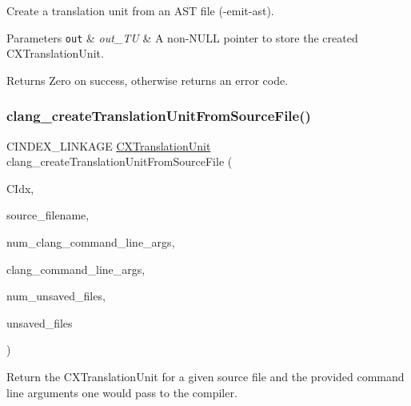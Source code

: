 Create a translation unit from an A\+ST file ({\ttfamily -\/emit-\/ast}). 


\begin{DoxyParams}[1]{Parameters}
\mbox{\tt out}  & {\em out\+\_\+\+TU} & A non-\/\+N\+U\+LL pointer to store the created {\ttfamily C\+X\+Translation\+Unit}.\\
\hline
\end{DoxyParams}
\begin{DoxyReturn}{Returns}
Zero on success, otherwise returns an error code. 
\end{DoxyReturn}
\mbox{\label{group__CINDEX__TRANSLATION__UNIT_gaf45dfbcd2e4d8e9eeab4778f994a74c3}} 
\subsubsection{\texorpdfstring{clang\+\_\+create\+Translation\+Unit\+From\+Source\+File()}{clang\_createTranslationUnitFromSourceFile()}}
{\footnotesize\ttfamily C\+I\+N\+D\+E\+X\+\_\+\+L\+I\+N\+K\+A\+GE \hyperlink{group__CINDEX_gacdb7815736ca709ce9a5e1ec2b7e16ac}{C\+X\+Translation\+Unit} clang\+\_\+create\+Translation\+Unit\+From\+Source\+File (\begin{DoxyParamCaption}\item[{\hyperlink{group__CINDEX_gae039c2574bfd75774ca7a9a3e55910cb}{C\+X\+Index}}]{C\+Idx,  }\item[{const char $\ast$}]{source\+\_\+filename,  }\item[{int}]{num\+\_\+clang\+\_\+command\+\_\+line\+\_\+args,  }\item[{const char $\ast$const $\ast$}]{clang\+\_\+command\+\_\+line\+\_\+args,  }\item[{unsigned}]{num\+\_\+unsaved\+\_\+files,  }\item[{struct \hyperlink{structCXUnsavedFile}{C\+X\+Unsaved\+File} $\ast$}]{unsaved\+\_\+files }\end{DoxyParamCaption})}



Return the C\+X\+Translation\+Unit for a given source file and the provided command line arguments one would pass to the compiler. 

